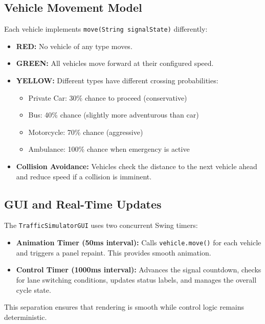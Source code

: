 \documentclass[12pt,a4paper]{article}
\begin{document}
\subsection{Vehicle Movement Model}
Each vehicle implements \texttt{move(String signalState)} differently:
\begin{itemize}
    \item \textbf{RED:} No vehicle of any type moves.
    \item \textbf{GREEN:} All vehicles move forward at their configured speed.
    \item \textbf{YELLOW:} Different types have different crossing probabilities:
    \begin{itemize}
        \item Private Car: 30\% chance to proceed (conservative)
        \item Bus: 40\% chance (slightly more adventurous than car)
        \item Motorcycle: 70\% chance (aggressive)
        \item Ambulance: 100\% chance when emergency is active
    \end{itemize}
    \item \textbf{Collision Avoidance:} Vehicles check the distance to the next vehicle ahead and reduce speed if a collision is imminent.
\end{itemize}

\subsection{GUI and Real-Time Updates}
The \texttt{TrafficSimulatorGUI} uses two concurrent Swing timers:
\begin{itemize}
    \item \textbf{Animation Timer (50ms interval):} Calls \texttt{vehicle.move()} for each vehicle and triggers a panel repaint. This provides smooth animation.
    \item \textbf{Control Timer (1000ms interval):} Advances the signal countdown, checks for lane switching conditions, updates status labels, and manages the overall cycle state.
\end{itemize}
This separation ensures that rendering is smooth while control logic remains deterministic.
\end{document}
